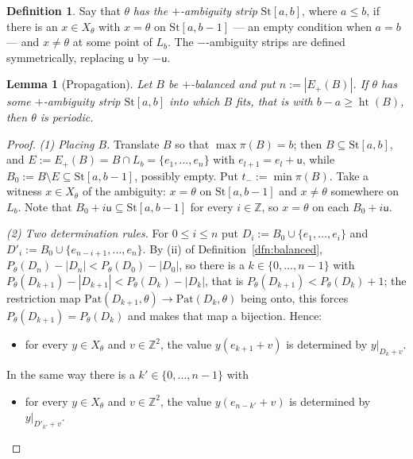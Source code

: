 \documentclass[11pt,reqno]{amsart}
\theoremstyle{plain}
\newtheorem{lem}[thm]{Lemma}
\theoremstyle{definition}
\newtheorem{dfn}[thm]{Definition}
\theoremstyle{remark}
\theoremstyle{plain}
\theoremstyle{remark}
\theoremstyle{definition}
\numberwithin{equation}{section}
\newcommand{\Z}{\mathbb{Z}}
\newcommand{\su}{\mathsf{u}}
\begin{document}
\begin{dfn}\label{dfn:ambiguity}
Say that $\theta$ \emph{has the $+$-ambiguity strip} $\mathrm{St}[a,b]$, where
$a\le b$, if there is an $x\in X_\theta$ with $x=\theta$ on
$\mathrm{St}[a,b-1]$ — an empty condition when $a=b$ — and $x\ne\theta$ at some
point of $L_b$.  The $-$-ambiguity strips are defined symmetrically, replacing
$\su$ by $-\su$.
\end{dfn}

\begin{lem}[Propagation]\label{lem:propagation}
Let $B$ be $+$-balanced and put $n:=|E_+(B)|$.  If $\theta$ has some
$+$-ambiguity strip $\mathrm{St}[a,b]$ into which $B$ fits, that is with
$b-a\ge\operatorname{ht}(B)$, then $\theta$ is periodic.
\end{lem}

\begin{proof}
\emph{(1) Placing $B$.}  Translate $B$ so that $\max\pi(B)=b$; then
$B\subseteq\mathrm{St}[a,b]$, and $E:=E_+(B)=B\cap L_b=\{e_1,\dots,e_n\}$ with
$e_{l+1}=e_l+\su$, while $B_0:=B\setminus E\subseteq\mathrm{St}[a,b-1]$, possibly
empty.  Put $t_-:=\min\pi(B)$.  Take a witness $x\in X_\theta$ of the ambiguity:
$x=\theta$ on $\mathrm{St}[a,b-1]$ and $x\ne\theta$ somewhere on $L_b$.  Note
that $B_0+i\su\subseteq\mathrm{St}[a,b-1]$ for every $i\in\Z$, so $x=\theta$ on
each $B_0+i\su$.

\emph{(2) Two determination rules.}  For $0\le i\le n$ put
$D_i:=B_0\cup\{e_1,\dots,e_i\}$ and $D'_i:=B_0\cup\{e_{n-i+1},\dots,e_n\}$.  By
(ii) of Definition~\ref{dfn:balanced}, $P_\theta(D_n)-|D_n|<P_\theta(D_0)-|D_0|$,
so there is a $k\in\{0,\dots,n-1\}$ with
$P_\theta(D_{k+1})-|D_{k+1}|<P_\theta(D_k)-|D_k|$, that is
$P_\theta(D_{k+1})<P_\theta(D_k)+1$; the restriction map
$\mathrm{Pat}(D_{k+1},\theta)\to\mathrm{Pat}(D_k,\theta)$ being onto, this forces
$P_\theta(D_{k+1})=P_\theta(D_k)$ and makes that map a bijection.  Hence:
\begin{itemize}
\item[\textup{(R$_+$)}] for every $y\in X_\theta$ and $v\in\Z^2$, the value
$y(e_{k+1}+v)$ is determined by $y|_{D_k+v}$.
\end{itemize}
In the same way there is a $k'\in\{0,\dots,n-1\}$ with
\begin{itemize}
\item[\textup{(R$_-$)}] for every $y\in X_\theta$ and $v\in\Z^2$, the value
$y(e_{n-k'}+v)$ is determined by $y|_{D'_{k'}+v}$.
\end{itemize}


\end{proof}
\end{document}
